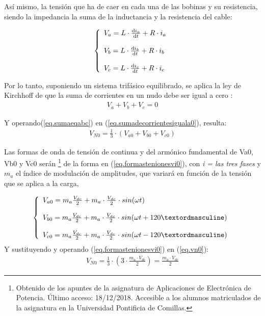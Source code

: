 \documentclass{report}
\begin{document}
Así mismo, la tensión que ha de caer en cada una de las bobinas y su resistencia, siendo la impedancia la suma de la inductancia y la resistencia del cable:

\begin{equation}
    \left\{\begin{array}{l}
    V_{a} =  L \cdot \frac{\mathrm{d} i_{a}}{\mathrm{d} t} + R \cdot i_{a}\\
    \null \\
    V_{b} =  L \cdot \frac{\mathrm{d} i_{b}}{\mathrm{d} t} + R \cdot i_{b}\\
    \null \\
    V_{c} =  L \cdot \frac{\mathrm{d} i_{c}}{\mathrm{d} t} + R \cdot i_{c} 
    \end{array} \right. 
    \label{eq.vabc}
\end{equation}



Por lo tanto, suponiendo un sistema trifásico equilibrado, se aplica la ley de Kirchhoff de que la suma de corrientes en un nudo debe ser igual a cero \cite{cuarenta}:
\begin{eqnarray}
    V_{a}+V_{b}+V_{c} = 0 \label{eq.sumadecorrientesiguala0}
\end{eqnarray}

Y operando(\ref{eq.sumaeqabc}) en (\ref{eq.sumadecorrientesiguala0}), resulta:
\begin{eqnarray}
    V_{N0} = \frac{1}{3} \cdot (V_{a0}+V_{b0}+V_{c0}) \label{eq.vn0}
\end{eqnarray}

Las formas de onda de tensión de continua y del armónico fundamental de Va0, Vb0 y Vc0 serán \footnote{Obtenido de los apuntes de la asignatura de Aplicaciones de Electrónica de Potencia. Último acceso: 18/12/2018. Accesible a los alumnos matriculados de la asignatura en la Universidad Pontificia de Comillas.} de la forma en (\ref{eq.formastenionesvi0}), con \textit{i = las tres fases} y $m_a$ el índice de modulación de amplitudes, que variará en función de la tensión que se aplica a la carga,

\begin{equation}
    \left\{\begin{array}{l}
        V_{a0} = m_a \frac{V_{dc}}{2} + m_a \cdot \frac{V_{dc}}{2} \cdot sin(\omega t) \label{eq.formastenionesvi0} \\
    \null \\
    V_{b0} = m_a \frac{V_{dc}}{2} + m_a \cdot \frac{V_{dc}}{2} \cdot sin(\omega t + 120º) \\
    \null \\
    V_{c0} = m_a \frac{V_{dc}}{2} + m_a \cdot \frac{V_{dc}}{2} \cdot sin(\omega t - 120º) \\
    \end{array} \right.
\end{equation}
\newline
Y sustituyendo y operando (\ref{eq.formastenionesvi0}) en (\ref{eq.vn0}):
\begin{eqnarray} 
    V_{N0} = \frac{1}{3} \cdot (3\cdot\frac{m_a \cdot V_{dc}}{2}) = \frac{m_a \cdot V_{dc}}{2} 
\end{eqnarray}
\end{document}
